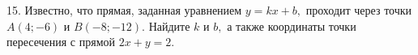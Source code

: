 15. Известно, что прямая, заданная уравнением $y=kx+b,$ проходит через точки $A(4;-6)$ и $B(-8;-12).$ Найдите $k$ и $b,$ а также координаты точки пересечения с прямой $2x+y=2.$\\
